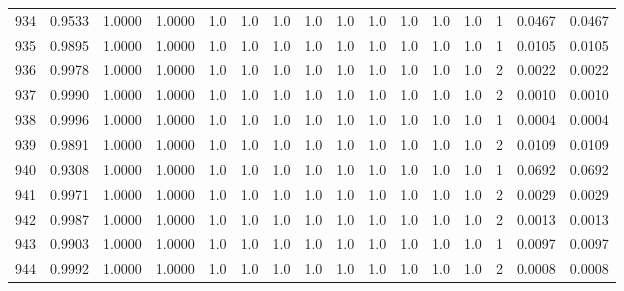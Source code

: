 \begin{tabular}{lrrrrrrrrrrrrrrr}
934 &      0.9533 &  1.0000 &  1.0000 &     1.0 &     1.0 &     1.0 &     1.0 &     1.0 &     1.0 &     1.0 &      1.0 &        1.0 &      1 &                    0.0467 &                     0.0467 \\
935 &      0.9895 &  1.0000 &  1.0000 &     1.0 &     1.0 &     1.0 &     1.0 &     1.0 &     1.0 &     1.0 &      1.0 &        1.0 &      1 &                    0.0105 &                     0.0105 \\
936 &      0.9978 &  1.0000 &  1.0000 &     1.0 &     1.0 &     1.0 &     1.0 &     1.0 &     1.0 &     1.0 &      1.0 &        1.0 &      2 &                    0.0022 &                     0.0022 \\
937 &      0.9990 &  1.0000 &  1.0000 &     1.0 &     1.0 &     1.0 &     1.0 &     1.0 &     1.0 &     1.0 &      1.0 &        1.0 &      2 &                    0.0010 &                     0.0010 \\
938 &      0.9996 &  1.0000 &  1.0000 &     1.0 &     1.0 &     1.0 &     1.0 &     1.0 &     1.0 &     1.0 &      1.0 &        1.0 &      1 &                    0.0004 &                     0.0004 \\
939 &      0.9891 &  1.0000 &  1.0000 &     1.0 &     1.0 &     1.0 &     1.0 &     1.0 &     1.0 &     1.0 &      1.0 &        1.0 &      2 &                    0.0109 &                     0.0109 \\
940 &      0.9308 &  1.0000 &  1.0000 &     1.0 &     1.0 &     1.0 &     1.0 &     1.0 &     1.0 &     1.0 &      1.0 &        1.0 &      1 &                    0.0692 &                     0.0692 \\
941 &      0.9971 &  1.0000 &  1.0000 &     1.0 &     1.0 &     1.0 &     1.0 &     1.0 &     1.0 &     1.0 &      1.0 &        1.0 &      2 &                    0.0029 &                     0.0029 \\
942 &      0.9987 &  1.0000 &  1.0000 &     1.0 &     1.0 &     1.0 &     1.0 &     1.0 &     1.0 &     1.0 &      1.0 &        1.0 &      2 &                    0.0013 &                     0.0013 \\
943 &      0.9903 &  1.0000 &  1.0000 &     1.0 &     1.0 &     1.0 &     1.0 &     1.0 &     1.0 &     1.0 &      1.0 &        1.0 &      1 &                    0.0097 &                     0.0097 \\
944 &      0.9992 &  1.0000 &  1.0000 &     1.0 &     1.0 &     1.0 &     1.0 &     1.0 &     1.0 &     1.0 &      1.0 &        1.0 &      2 &                    0.0008 &                     0.0008 \\

\end{tabular}
